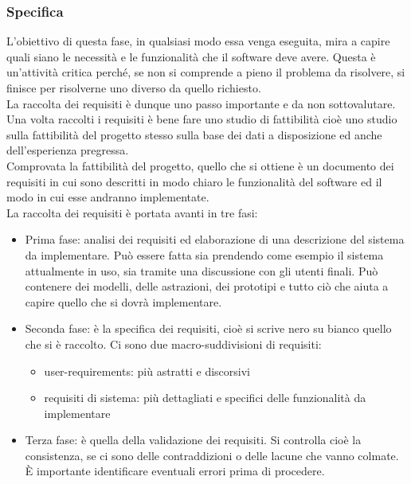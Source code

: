 \subsubsection{Specifica}
L'obiettivo di questa fase, in qualsiasi modo essa venga eseguita, mira a capire quali siano le necessità e le funzionalità che il software deve avere.
Questa è un'attività critica perché, se non si comprende a pieno il problema da risolvere, si finisce per risolverne uno diverso da quello richiesto.\\
La raccolta dei requisiti è dunque uno passo importante e da non sottovalutare.\\
Una volta raccolti i requisiti è bene fare uno studio di fattibilità cioè uno studio sulla fattibilità del progetto stesso sulla base dei dati a disposizione ed anche dell'esperienza pregressa.\\
Comprovata la fattibilità del progetto, quello che si ottiene è un documento dei requisiti in cui sono descritti in modo chiaro le funzionalità del software ed il modo in cui esse andranno implementate.\\
La raccolta dei requisiti è portata avanti in tre fasi:
\begin{itemize}[noitemsep]
    \item Prima fase: analisi dei requisiti ed elaborazione di una descrizione del sistema da implementare. Può essere fatta sia prendendo come esempio il sistema attualmente in uso, sia tramite una discussione con gli utenti finali. Può contenere dei modelli, delle astrazioni, dei prototipi e tutto ciò che aiuta a capire quello che si dovrà implementare.
    \item Seconda fase: è la specifica dei requisiti, cioè si scrive nero su bianco quello che si è raccolto. Ci sono due macro-suddivisioni di requisiti:
    \begin{itemize}[noitemsep]
        \item user-requirements: più astratti e discorsivi
        \item requisiti di sistema: più dettagliati e specifici delle funzionalità da implementare
    \end{itemize}
    \item Terza fase: è quella della validazione dei requisiti. Si controlla cioè la consistenza, se ci sono delle contraddizioni o delle lacune che vanno colmate. È importante identificare eventuali errori prima di procedere.
\end{itemize}

